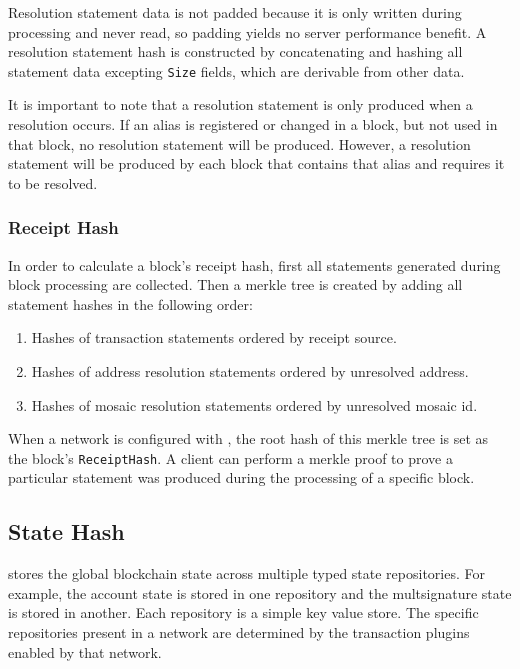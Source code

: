 Resolution statement data is not padded because it is only written during processing and never read, so padding yields no server performance benefit.
A resolution statement hash is constructed by concatenating and hashing all statement data excepting \texttt{Size} fields, which are derivable from other data.

It is important to note that a resolution statement is only produced when a resolution occurs.
If an alias is registered or changed in a block, but not used in that block, no resolution statement will be produced.
However, a resolution statement will be produced by each block that contains that alias and requires it to be resolved.

\subsubsection{Receipt Hash}

In order to calculate a block's receipt hash, first all statements generated during block processing are collected.
Then a merkle tree is created by adding all statement hashes in the following order:

\begin{enumerate}
\item{Hashes of transaction statements ordered by receipt source.}
\item{Hashes of address resolution statements ordered by unresolved address.}
\item{Hashes of mosaic resolution statements ordered by unresolved mosaic id.}
\end{enumerate}

When a network is configured with , the root hash of this merkle tree is set as the block's \texttt{ReceiptHash}.
A client can perform a merkle proof to prove a particular statement was produced during the processing of a specific block.

\subsection{State Hash}
\label{sec:blocks:statehash}

\codenamespace stores the global blockchain state across multiple typed state repositories.
For example, the account state is stored in one repository and the multsignature state is stored in another.
Each repository is a simple key value store.
The specific repositories present in a network are determined by the transaction plugins enabled by that network.

